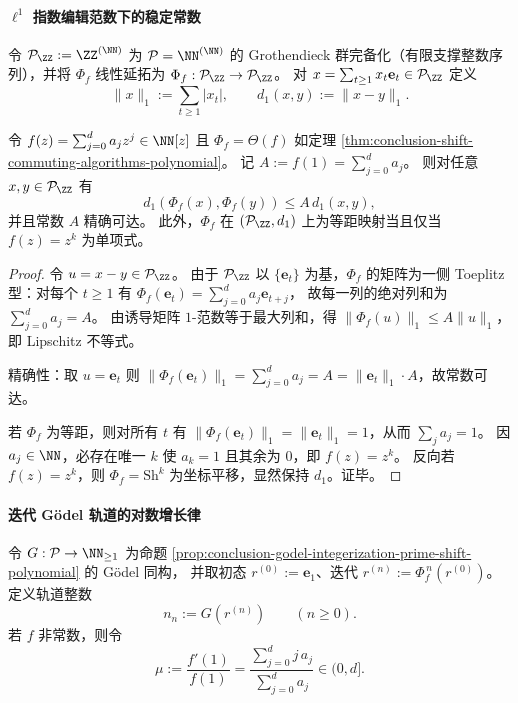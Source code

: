 
\paragraph{\texorpdfstring{$\ell^1$}{l1} 指数编辑范数下的稳定常数}
令 \(\mathcal P_{\ZZ}:=\ZZ^{(\NN)}\) 为 \(\mathcal P=\NN^{(\NN)}\) 的 Grothendieck 群完备化（有限支撑整数序列），并将 \(\Phi_f\) 线性延拓为 \(\Phi_f:\mathcal P_{\ZZ}\to\mathcal P_{\ZZ}\)。
对 \(x=\sum_{t\ge 1}x_t\mathbf e_t\in\mathcal P_{\ZZ}\) 定义
\[
\|x\|_{1}:=\sum_{t\ge 1}|x_t|,
\qquad
d_1(x,y):=\|x-y\|_1.
\]

\begin{theorem}\label{thm:conclusion-prime-register-l1-lipschitz-isometry}
令 \(f(z)=\sum_{j=0}^{d}a_j z^j\in\NN[z]\) 且 \(\Phi_f=\Theta(f)\) 如定理 \ref{thm:conclusion-shift-commuting-algorithms-polynomial}。
记 \(A:=f(1)=\sum_{j=0}^{d}a_j\)。
则对任意 \(x,y\in\mathcal P_{\ZZ}\) 有
\[
d_1(\Phi_f(x),\Phi_f(y))\le A\,d_1(x,y),
\]
并且常数 \(A\) 精确可达。
此外，\(\Phi_f\) 在 \((\mathcal P_{\ZZ},d_1)\) 上为等距映射当且仅当 \(f(z)=z^{k}\) 为单项式。
\end{theorem}
\begin{proof}
令 \(u=x-y\in\mathcal P_{\ZZ}\)。
由于 \(\mathcal P_{\ZZ}\) 以 \(\{\mathbf e_t\}\) 为基，\(\Phi_f\) 的矩阵为一侧 Toeplitz 型：对每个 \(t\ge 1\) 有
\(
\Phi_f(\mathbf e_t)=\sum_{j=0}^{d}a_j\mathbf e_{t+j}
\)，
故每一列的绝对列和为 \(\sum_{j=0}^{d}a_j=A\)。
由诱导矩阵 \(1\)-范数等于最大列和，得 \(\|\Phi_f(u)\|_1\le A\|u\|_1\)，即 Lipschitz 不等式。

精确性：取 \(u=\mathbf e_t\) 则
\(
\|\Phi_f(\mathbf e_t)\|_1=\sum_{j=0}^{d}a_j=A=\|\mathbf e_t\|_1\cdot A
\)，故常数可达。

若 \(\Phi_f\) 为等距，则对所有 \(t\) 有 \(\|\Phi_f(\mathbf e_t)\|_1=\|\mathbf e_t\|_1=1\)，从而 \(\sum_{j}a_j=1\)。
因 \(a_j\in\NN\)，必存在唯一 \(k\) 使 \(a_k=1\) 且其余为 \(0\)，即 \(f(z)=z^k\)。
反向若 \(f(z)=z^k\)，则 \(\Phi_f=\mathrm{Sh}^{k}\) 为坐标平移，显然保持 \(d_1\)。证毕。
\end{proof}

\paragraph{迭代 Gödel 轨道的对数增长律}
令 \(G:\mathcal P\to\NN_{\ge 1}\) 为命题 \ref{prop:conclusion-godel-integerization-prime-shift-polynomial} 的 Gödel 同构，
并取初态 \(r^{(0)}:=\mathbf e_1\)、迭代 \(r^{(n)}:=\Phi_f^{\,n}(r^{(0)})\)。
定义轨道整数
\[
n_n:=G(r^{(n)})\qquad(n\ge 0).
\]
若 \(f\) 非常数，则令
\[
\mu:=\frac{f'(1)}{f(1)}=\frac{\sum_{j=0}^{d}j\,a_j}{\sum_{j=0}^{d}a_j}\in(0,d].
\]

